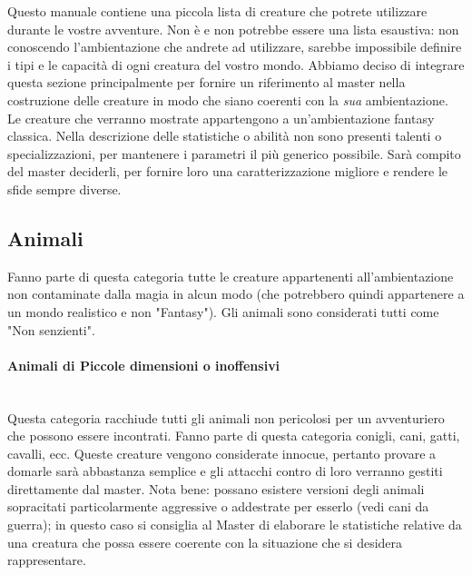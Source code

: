 \documentclass[../manuale_main.tex]{subfiles}
\begin{document}
Questo manuale contiene una piccola lista di creature che potrete utilizzare durante le vostre avventure. Non è e non potrebbe essere una lista esaustiva: non conoscendo l'ambientazione che andrete ad utilizzare, sarebbe impossibile definire i tipi e le capacità di ogni creatura del vostro mondo. Abbiamo deciso di integrare questa sezione principalmente per fornire un riferimento al master nella costruzione delle creature in modo che siano coerenti con la \emph{sua} ambientazione.\\
Le creature che verranno mostrate appartengono a un'ambientazione fantasy classica.
Nella descrizione delle statistiche o abilità non sono presenti talenti o specializzazioni, per mantenere i parametri il più generico possibile. Sarà compito del master deciderli, per fornire loro una caratterizzazione migliore e rendere le sfide sempre diverse.

\subsection{Animali}
Fanno parte di questa categoria tutte le creature appartenenti all'ambientazione non contaminate dalla magia in alcun modo (che potrebbero quindi appartenere a un mondo realistico e non "Fantasy"). Gli animali sono considerati tutti come "Non senzienti".

\paragraph{Animali di Piccole dimensioni o inoffensivi}\mbox{}\\ 
Questa categoria racchiude tutti gli animali non pericolosi per un avventuriero che possono essere incontrati. Fanno parte di questa categoria conigli, cani, gatti, cavalli, ecc. Queste creature vengono considerate innocue, pertanto provare a domarle sarà abbastanza semplice e gli attacchi contro di loro verranno gestiti direttamente dal master.  Nota bene: possano esistere versioni degli animali sopracitati particolarmente aggressive o addestrate per esserlo (vedi cani da guerra); in questo caso si consiglia al Master di elaborare le statistiche relative da una creatura che possa essere coerente con la situazione che si desidera rappresentare.
\end{document}
